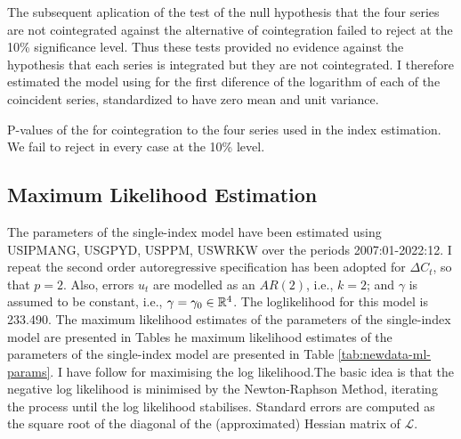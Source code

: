 The subsequent aplication of the  test of the null hypothesis that the four series are not cointegrated against the alternative of cointegration failed to reject at the 10\% significance level. Thus these tests provided no evidence against the hypothesis that each series is integrated but they are not cointegrated. I therefore estimated the model using for the first diference of the logarithm of each of the coincident series, standardized to have zero mean and unit variance.

\begin{table}[h!]
	\centering\small
	\captionsetup{width=0.6\textwidth, font=small}
	\caption{P-values of the \protect\cite{engle1987co} for cointegration to the four series used in the index estimation. We fail to reject in every case at the 10\% level.}
	
\end{table}

\subsection{Maximum Likelihood Estimation}

The parameters of the single-index model have been estimated using USIPMANG, USGPYD, USPPM, USWRKW over the periods 2007:01-2022:12. I repeat the second order autoregressive  specification  has been adopted for $\Delta C_t$, so that $p=2$. Also, errors $u_t$ are modelled as an $AR(2)$, i.e., $k=2$; and $\gamma$ is assumed to be constant, i.e., $\gamma = \gamma_0\in\mathbb{R}^4$. The loglikelihood for this model is 233.490. The maximum likelihood estimates of the parameters of the single-index model are presented in Tables  he maximum likelihood estimates of the parameters of the single-index model are presented in Table \ref{tab:newdata-ml-params}. I have follow  for maximising the log likelihood.The basic idea is that the negative log likelihood is minimised by the Newton-Raphson Method, iterating the process until the log likelihood stabilises. Standard errors are computed as the square root of the diagonal of the (approximated) Hessian matrix of $\mathcal{L}$.



